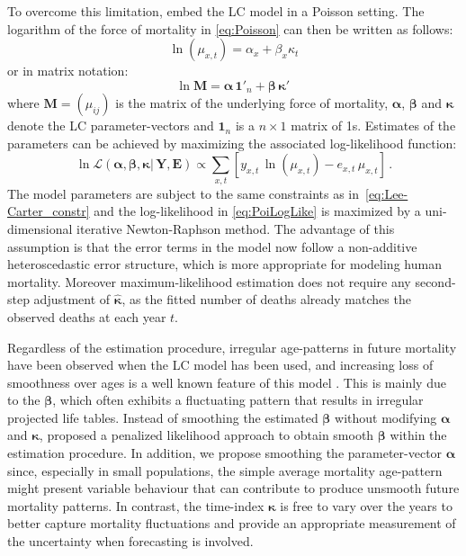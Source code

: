 \documentclass[Thesis]{subfiles}
\begin{document}
To overcome this limitation, \cite{brouhns2002poisson} embed the LC model in a Poisson setting. The logarithm of the force of mortality in \eqref{eq:Poisson} can then be written as follows:
\begin{equation}\label{eq:LCmu}
\ln(\mu_{x,t}) = \alpha_{x} + \beta_{x}\kappa_{t}
\end{equation}
or in matrix notation:
\begin{equation}\label{eq:LCmatrix}
\ln \bm{M} = \bm{\alpha}\,\bm{1}'_{n} + \bm{\beta}\,\bm{\kappa}'\,  
\end{equation}
where $\bm{M} = (\mu_{ij})$ is the matrix of the underlying force of mortality, $\bm{\alpha}$, $\bm{\beta}$ and $\bm{\kappa}$ denote the LC parameter-vectors and $\bm{1}_{n}$ is a $n \times 1$ matrix of 1s. 
Estimates of the parameters can be achieved by maximizing the associated log-likelihood function:
\begin{equation}\label{eq:PoiLogLike}
\ln\mathcal{L}\left(\bm{\alpha}, \bm{\beta}, \bm{\kappa} | \, \bm{Y} , \bm{E}\right) \propto \sum_{x,t} \left[ y_{x,t} \, \ln \left ( \mu_{x,t}  \right ) - e_{x,t}
\, \mu_{x,t} \right]  \, . 
\end{equation}
The model parameters are subject to the same constraints as in~\eqref{eq:Lee-Carter_constr} and the log-likelihood in \eqref{eq:PoiLogLike} is maximized by a uni-dimensional iterative Newton-Raphson method. The advantage of this assumption is that the error terms in the model now follow a non-additive heteroscedastic error structure, which is more appropriate for modeling human mortality. Moreover maximum-likelihood estimation does not require any second-step adjustment of $\hat{\bm{\kappa}}$, as the fitted number of deaths already matches the observed deaths at each year $t$.

Regardless of the estimation procedure, irregular age-patterns in future mortality have been observed when the LC model has been used, and increasing loss of smoothness over ages is a well known feature of this model \citep{girosi2007understanding, girosi2008demographic}. This is mainly due to the $\bm{\beta}$, which often exhibits a fluctuating pattern that results in irregular projected life tables. Instead of smoothing the estimated $\bm{\beta}$ without modifying $\bm{\alpha}$ and $\bm{\kappa}$, \citet{delwarde2007smoothing} proposed a penalized likelihood approach to obtain smooth $\bm{\beta}$ within the estimation procedure. In addition, we propose smoothing the parameter-vector $\bm{\alpha}$ since, especially in small populations, the simple average mortality age-pattern might present variable behaviour that can contribute to produce unsmooth future mortality patterns. In contrast, the time-index $\bm{\kappa}$ is free to vary over the years to better capture mortality fluctuations and provide an appropriate measurement of the uncertainty when forecasting is involved. 
\end{document}
